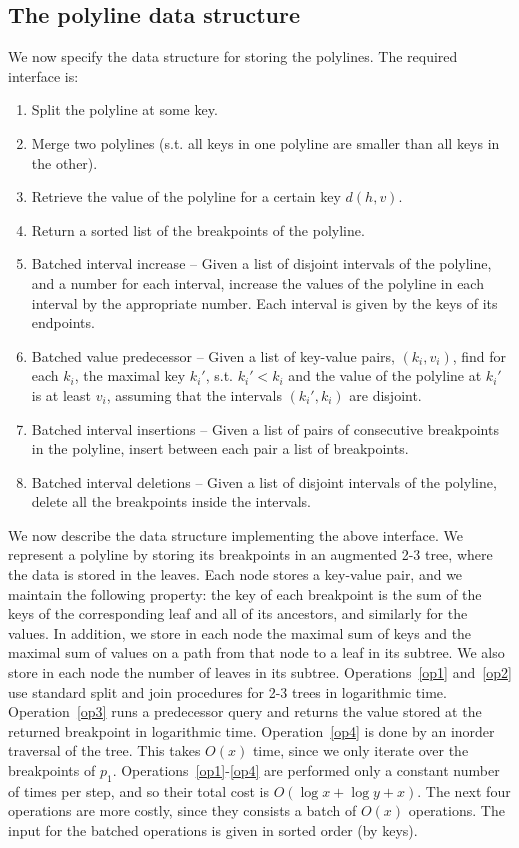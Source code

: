 \documentclass[11pt,a4paper]{article}
\theoremstyle{definition}
\theoremstyle{remark}
\begin{document}
\subsection{The polyline data structure} We now specify the data structure for storing the polylines. The required interface is:
\begin{enumerate}
\item \label{op1} Split the polyline at some key.
\item \label{op2} Merge two polylines (s.t. all  keys in one polyline are smaller than all keys in the other).
\item \label{op3} Retrieve the value of the polyline for a certain key $d(h,v)$.
\item \label{op4}Return a sorted list of the breakpoints of the polyline.
\item \label{op5} Batched interval increase -- Given a list of disjoint intervals of the polyline, and a number for each interval, increase the values of the polyline in each interval by the appropriate number. Each interval is given by the keys of its endpoints.
\item \label{op6} Batched value predecessor -- Given a list of key-value pairs, $(k_i,v_i)$, find for each $k_i$, the maximal key $k_{i}'$, s.t. $k_{i}' < k_i$ and the value of the polyline at $k_{i}'$ is at least $v_i$, assuming that the intervals $(k_{i}',k_{i})$ are disjoint.
\item \label{op7} Batched interval insertions -- Given a list of pairs of consecutive breakpoints in the polyline, insert between each pair a list of breakpoints.
\item \label{op8} Batched interval deletions -- Given a list of disjoint intervals of the polyline, delete all the breakpoints inside the intervals.
\end{enumerate}
We now describe the data structure implementing the above interface. We represent a polyline by storing its breakpoints in an augmented 2-3 tree, where the data is stored in the leaves. Each node stores a key-value pair, and we maintain the following property: the key of each breakpoint is the sum of the keys of the corresponding leaf and all of its ancestors, and similarly for the values. In addition, we store in each node the maximal sum of keys and the maximal sum of values on a path from that node to a leaf in its subtree. We also store in each node the number of leaves in its subtree. %
Operations~\ref{op1} and~\ref{op2} use standard split and join procedures for 2-3 trees in logarithmic time. 
Operation~\ref{op3} runs a predecessor query and returns the value stored at the returned breakpoint in logarithmic time.
Operation~\ref{op4} is done by an inorder traversal of the tree. This takes $O(x)$ time, since we only iterate over the breakpoints of $p_{1}$. 
Operations~\ref{op1}-\ref{op4} are performed only a constant number of times per step, and so their total cost is $O(\log x + \log y + x)$. The next four operations are more costly, since they consists a batch of $O(x)$ operations. The input for the batched operations is given in sorted order (by keys).
\end{document}
